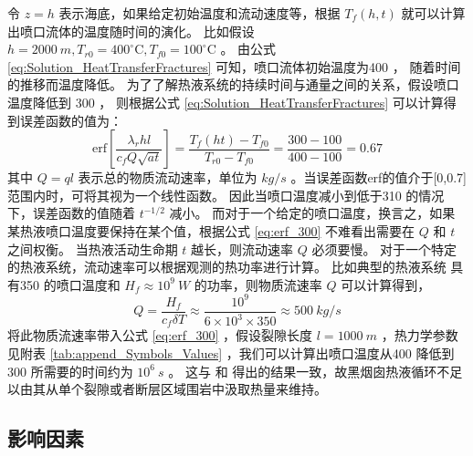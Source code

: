 令 $ z=h $ 表示海底，如果给定初始温度和流动速度等，根据 $ T_f(h,t) $ 就可以计算出喷口流体的温度随时间的演化。
比如假设 $ h=2000 \ m, T_{r0} =400^{\circ} \text{C} , T_{f0} =100^{\circ} \text{C}   $ 。
由公式 \ref{eq:Solution_HeatTransferFractures} 可知，喷口流体初始温度为400 \ssd，
随着时间的推移而温度降低。
为了了解热液系统的持续时间与通量之间的关系，假设喷口温度降低到 300 \ssd ，
则根据公式 \ref{eq:Solution_HeatTransferFractures} 可以计算得到误差函数的值为：
\begin{equation} 
	\text{erf} \left[\frac{\lambda_r h l} {c_f Q\sqrt{at} } \right] = \frac{T_f(ht) - T_{f0} } {T_{r0}  - T_{f0} }  = \frac{300-100} {400-100}  = 0.67
	\label{eq:erf_300} 
\end{equation} 
其中 $ Q=ql $ 表示总的物质流动速率，单位为 $ kg/s $ 。当误差函数erf的值介于[0,0.7]范围内时，可将其视为一个线性函数。
因此当喷口温度减小到低于310 \ssd 的情况下，误差函数的值随着 $ t^{-1/2}  $ 减小。
而对于一个给定的喷口温度，换言之，如果某热液喷口温度要保持在某个值，根据公式 \ref{eq:erf_300} 不难看出需要在 $ Q $ 和 $ t $ 之间权衡。
当热液活动生命期  $ t $ 越长，则流动速率 $ Q $ 必须要慢。
对于一个特定的热液系统，流动速率可以根据观测的热功率进行计算。
比如典型的热液系统 \citep{lowell2013characteristics} 具有350 \ssd 的喷口温度和 $ H_f \approx 10^9\ W $ 的功率，则物质流速率 $ Q $ 可以计算得到，
\begin{equation} 
	Q = \frac{H_f} {c_f \delta T}  \approx \frac{10^9} {6 \times 10^3 \times 350}  \approx 500 \ kg/s
	\label{eq:MassFlowRate_350} 
\end{equation} 
将此物质流速率带入公式 \ref{eq:erf_300} ，假设裂隙长度 $ l=1000 \ m $ ，热力学参数见附表 \ref{tab:append_Symbols_Values} ，我们可以计算出喷口温度从400 \ssd 降低到 300 \ssd 所需要的时间约为  $ 10^6\ s $ 。
这与  \cite{strens1982model}  和  \cite{lowell1985hydrothermal} 得出的结果一致，故黑烟囱热液循环不足以由其从单个裂隙或者断层区域围岩中汲取热量来维持。





\subsection{影响因素} 

